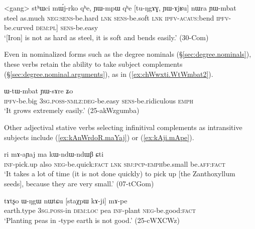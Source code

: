 \begin{exe}
\ex \label{ex:YAjRu.YWmbat}
\gll <gang> stʰɯci mɯ́j-rko qʰe, ɲɯ-mpɯ qʰe [tu-ŋgɤɣ, ɲɯ-ɤjʁu] nɯra ɲɯ-mbat \\
steel as.much \textsc{neg}:\textsc{sens}-be.hard \textsc{lnk} \textsc{sens}-be.soft \textsc{lnk} \textsc{ipfv}-\textsc{acaus}:bend \textsc{ipfv}-be.curved  \textsc{dem}:\textsc{pl}] \textsc{sens}-be.easy \\
\glt `[Iron] is not as hard as steel, it is soft and bends easily.' (30-Com)
\end{exe}

Even in nominalized forms such as the degree nominals (§\ref{sec:degree.nominals}), these verbs retain the ability to take subject complements (§\ref{sec:degree.nominal.arguments}), as in (\ref{ex:chWwxti.WtWmbat2}).

\begin{exe}
\ex \label{ex:chWwxti.WtWmbat2}
 ɯ-tɯ-mbat ɲɯ-sɤre ʑo  \\
\textsc{ipfv}-be.big \textsc{3sg}.\textsc{poss}-\textsc{nmlz}:\textsc{deg}-be.easy \textsc{sens}-be.ridiculous \textsc{emph} \\
\glt `It grows extremely easily.' (25-akWzgumba)
\end{exe}

Other adjectival stative verbs selecting infinitival complements as intransitive subjects include  (\ref{ex:kAnWrdoR.maYaj}) or  (\ref{ex:kAji.mApe}).

\begin{exe}
\ex \label{ex:kAnWrdoR.maYaj}
\gll [kɤ-nɯrdoʁ] ri mɤ-aɲaj ma kɯ-ndɯ-ndɯβ ɕti \\
\textsc{inf}-pick.up also \textsc{neg}-be.quick:\textsc{fact} \textsc{lnk} \textsc{sbj}:\textsc{pcp}-\textsc{emph}\redp{}be.small be.\textsc{aff}:\textsc{fact} \\
\glt `It takes a lot of time (it is not done quickly) to pick up [the Zanthoxyllum seeds], because they are very small.' (07-tCGom)
\end{exe}

 \begin{exe}
\ex \label{ex:kAji.mApe}
\gll tɤtʂo ɯ-ŋgɯ nɯtɕu [staχpɯ kɤ-ji] mɤ-pe \\
earth.type \textsc{3sg}.\textsc{poss}-in \textsc{dem}:\textsc{loc} pea \textsc{inf}-plant \textsc{neg}-be.good:\textsc{fact} \\
\glt `Planting peas in -type earth is not good.' (25-cWXCWz)
\end{exe}


